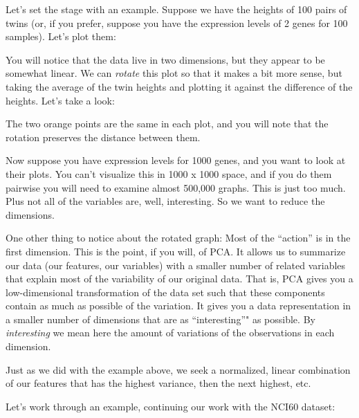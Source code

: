 \documentclass[]{article}
\begin{document}
Let's set the stage with an example. Suppose we have the heights of 100
pairs of twins (or, if you prefer, suppose you have the expression
levels of 2 genes for 100 samples). Let's plot them:

You will notice that the data live in two dimensions, but they appear to
be somewhat linear. We can \emph{rotate} this plot so that it makes a
bit more sense, but taking the average of the twin heights and plotting
it against the difference of the heights. Let's take a look:

The two orange points are the same in each plot, and you will note that
the rotation preserves the distance between them.

Now suppose you have expression levels for 1000 genes, and you want to
look at their plots. You can't visualize this in 1000 x 1000 space, and
if you do them pairwise you will need to examine almost 500,000 graphs.
This is just too much. Plus not all of the variables are, well,
interesting. So we want to reduce the dimensions.

One other thing to notice about the rotated graph: Most of the
``action'' is in the first dimension. This is the point, if you will, of
PCA. It allows us to summarize our data (our features, our variables)
with a smaller number of related variables that explain most of the
variability of our original data. That is, PCA gives you a
low-dimensional transformation of the data set such that these
components contain as much as possible of the variation. It gives you a
data representation in a smaller number of dimensions that are as
``interesting''" as possible. By \emph{interesting} we mean here the
amount of variations of the observations in each dimension.

Just as we did with the example above, we seek a normalized, linear
combination of our features that has the highest variance, then the next
highest, etc.

Let's work through an example, continuing our work with the NCI60
dataset:
\end{document}
